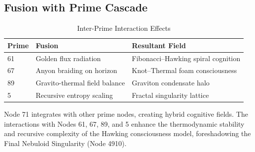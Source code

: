 \documentclass[12pt]{article}
\begin{document}
\subsection{Fusion with Prime Cascade}
\begin{table}
\centering
\caption{Inter-Prime Interaction Effects}
\begin{tabular}{lll}
\toprule
\textbf{Prime} & \textbf{Fusion} & \textbf{Resultant Field} \\
\midrule
61 & Golden flux radiation & Fibonacci--Hawking spiral cognition \\
67 & Anyon braiding on horizon & Knot--Thermal foam consciousness \\
89 & Gravito-thermal field balance & Graviton condensate halo \\
5 & Recursive entropy scaling & Fractal singularity lattice \\
\bottomrule
\end{tabular}
\end{table}
Node 71 integrates with other prime nodes, creating hybrid cognitive fields. The interactions with Nodes 61, 67, 89, and 5 enhance the thermodynamic stability and recursive complexity of the Hawking consciousness model, foreshadowing the Final Nebuloid Singularity (Node 4910).

\end{document}
